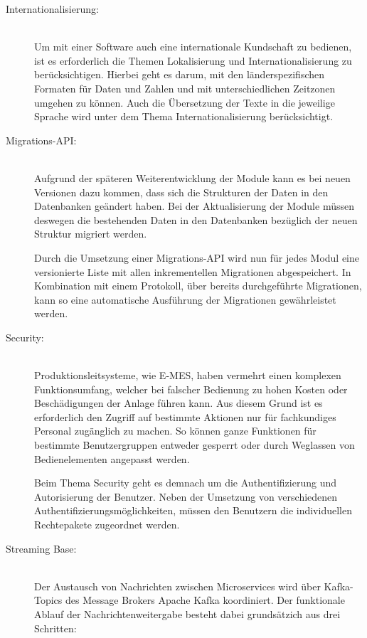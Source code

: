 \begin{description}
    \item[Internationalisierung:]\hfill \\
    Um mit einer Software auch eine internationale Kundschaft zu bedienen, ist es erforderlich die Themen Lokalisierung und Internationalisierung zu berücksichtigen. Hierbei geht es darum, mit den länderspezifischen Formaten für Daten und Zahlen und mit unterschiedlichen Zeitzonen umgehen zu können. Auch die Übersetzung der Texte in die jeweilige Sprache wird unter dem Thema Internationalisierung berücksichtigt.
    
    \item[Migrations-API:]\hfill \\
    Aufgrund der späteren Weiterentwicklung der Module kann es bei neuen Versionen dazu kommen, dass sich die Strukturen der Daten in den Datenbanken geändert haben. Bei der Aktualisierung der Module müssen deswegen die bestehenden Daten in den Datenbanken bezüglich der neuen Struktur migriert werden.

    Durch die Umsetzung einer Migrations-API wird nun für jedes Modul eine versionierte Liste mit allen inkrementellen Migrationen abgespeichert. In Kombination mit einem Protokoll, über bereits durchgeführte Migrationen, kann so eine automatische Ausführung der Migrationen gewährleistet werden.

    \item[Security:]\hfill \\
    Produktionsleitsysteme, wie \glqq E-MES\grqq{}, haben vermehrt einen komplexen Funktionsumfang, welcher bei falscher Bedienung zu hohen Kosten oder Beschädigungen der Anlage führen kann. Aus diesem Grund ist es erforderlich den Zugriff auf bestimmte Aktionen nur für fachkundiges Personal zugänglich zu machen. So können ganze Funktionen für bestimmte Benutzergruppen entweder gesperrt oder durch Weglassen von Bedienelementen angepasst werden.

    Beim Thema \glqq Security\grqq{} geht es demnach um die Authentifizierung und Autorisierung der Benutzer. Neben der Umsetzung von verschiedenen Authentifizierungsmöglichkeiten, müssen den Benutzern die individuellen Rechtepakete zugeordnet werden.

    \item[Streaming Base:]\hfill \\
    Der Austausch von Nachrichten zwischen Microservices wird über Kafka-Topics des Message Brokers \glqq Apache Kafka\grqq{} koordiniert. Der funktionale Ablauf der Nachrichtenweitergabe besteht dabei grundsätzich aus drei Schritten:


\end{description}
